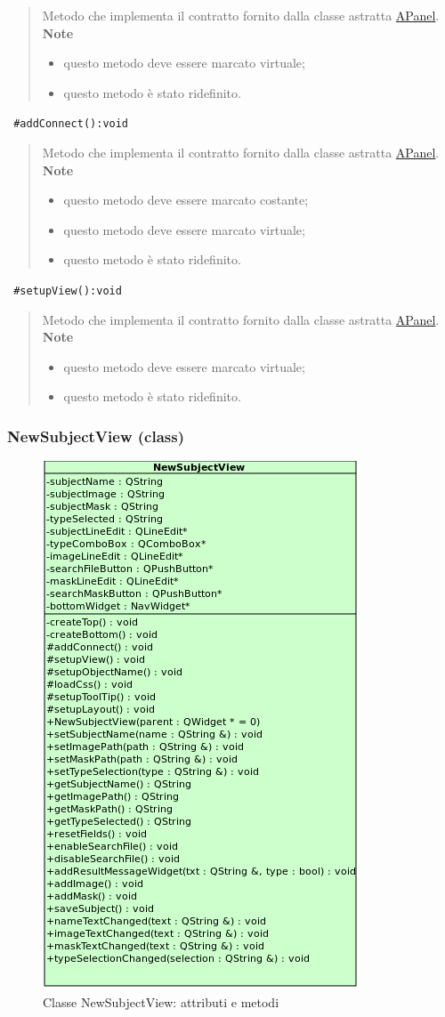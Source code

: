 \begin{quote}
\color{black} Metodo che implementa il contratto fornito dalla classe astratta \hyperref[speAPanel]{APanel}.\\
 \textbf{Note}
 \begin{itemize}
 \item questo metodo deve essere marcato virtuale;
 \item questo metodo è stato ridefinito.
 \end{itemize}
\end{quote} 
\color{blue}\verb! #addConnect():void!
\begin{quote}
\color{black} Metodo che implementa il contratto fornito dalla classe astratta \hyperref[speAPanel]{APanel}.\\
 \textbf{Note}
 \begin{itemize}
 \item questo metodo deve essere marcato costante;
 \item questo metodo deve essere marcato virtuale;
 \item questo metodo è stato ridefinito.
 \end{itemize}
\end{quote} 
\color{blue}\verb! #setupView():void!
\color{black}
\begin{quote}Metodo che implementa il contratto fornito dalla classe astratta \hyperref[speAPanel]{APanel}.
\textbf{Note}
\begin{itemize}
\item questo metodo deve essere marcato virtuale;
\item questo metodo è stato ridefinito.
\end{itemize}
\end{quote}
\color{black}
\pagebreak
\subsubsection{NewSubjectView (class)}
\label{speNsubV}
\begin{figure}[!h]
\centering
			\includegraphics[width=0.4\linewidth]{./Content/Immagini/view/NewSubjectView.png}
			\caption{Classe NewSubjectView: attributi e metodi}
			\label{cl_nsubview}
\end{figure}
